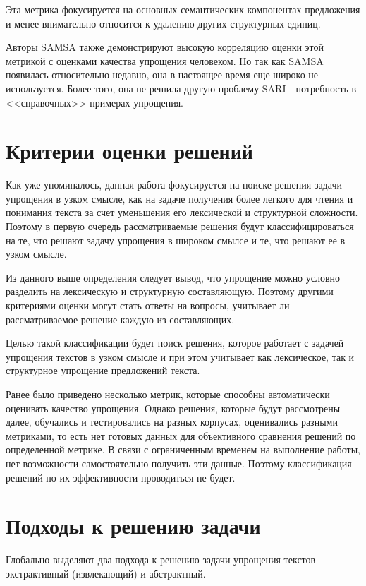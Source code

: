 Эта метрика фокусируется на основных семантических компонентах предложения и менее внимательно относится к удалению других структурных единиц.

Авторы SAMSA также демонстрируют высокую корреляцию оценки этой метрикой с оценками качества упрощения человеком. Но так как SAMSA появилась относительно недавно, она в настоящее время еще широко не используется. Более того, она не решила другую проблему SARI - потребность в <<справочных>> примерах упрощения.


\section{Критерии оценки решений}

Как уже упоминалось, данная работа фокусируется на поиске решения задачи упрощения в узком смысле, как на задаче получения более легкого для чтения и понимания текста за счет уменьшения его лексической и структурной сложности\cite{martin_muss_2021}. Поэтому в первую очередь рассматриваемые решения будут классифицироваться на те, что решают задачу упрощения в широком смылсе и те, что решают ее в узком смысле.

Из данного выше определения следует вывод, что упрощение можно условно разделить на лексическую и структурную составляющую. Поэтому другими критериями оценки могут стать ответы на вопросы, учитывает ли рассматриваемое решение каждую из составляющих.

Целью такой классификации будет поиск решения, которое работает с задачей упрощения текстов в узком смысле и при этом учитывает как лексическое, так и структурное упрощение предложений текста.

Ранее было приведено несколько метрик, которые способны автоматически оценивать качество упрощения. Однако решения, которые будут рассмотрены далее, обучались и тестировались на разных корпусах, оценивались разными метриками, то есть нет готовых данных для объективного сравнения решений по определенной метрике. В связи с ограниченным временем на выполнение работы, нет возможности самостоятельно получить эти данные. Поэтому классификация решений по их эффективности проводиться не будет.


\section{Подходы к решению задачи}

Глобально выделяют два подхода к решению задачи упрощения текстов - экстрактивный (извлекающий) и абстрактный.

